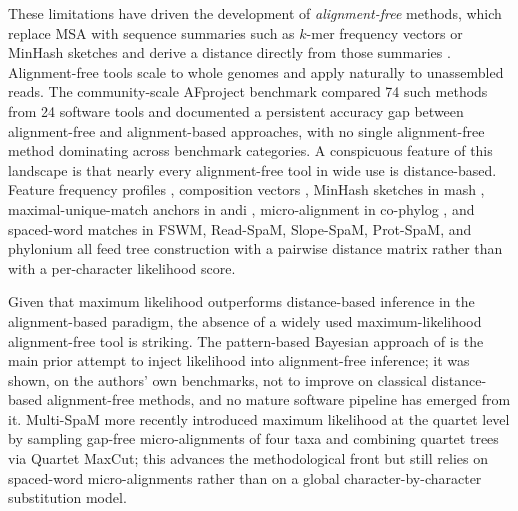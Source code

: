 \documentclass[11pt]{article}
\begin{document}
These limitations have driven the development of \emph{alignment-free} methods,
which replace MSA with sequence summaries such as $k$-mer frequency vectors
or MinHash sketches and derive a distance directly from those summaries
\citep{vinga2003review, zielezinski2017review}. Alignment-free tools scale to
whole genomes and apply naturally to unassembled reads. The community-scale
AFproject benchmark \citep{zielezinski2019afproject} compared 74 such methods
from 24 software tools and documented a persistent accuracy gap between
alignment-free and alignment-based approaches, with no single alignment-free
method dominating across benchmark categories. A conspicuous feature of this
landscape is that nearly every alignment-free tool in wide use is
distance-based. Feature frequency profiles
\citep{sims2009ffp}, composition vectors \citep{gao2007cvtree, lu2017cafe},
MinHash sketches in mash \citep{ondov2016mash}, maximal-unique-match anchors
in andi \citep{haubold2015andi}, micro-alignment in co-phylog
\citep{yi2013cophylog}, and spaced-word matches in FSWM, Read-SpaM,
Slope-SpaM, Prot-SpaM, and phylonium
\citep{morgenstern2015spacedwords, lau2019readspam, rohling2020slopespam,
leimeister2019protspam, klotzl2020phylonium} all feed tree construction with
a pairwise distance matrix rather than with a per-character likelihood score.

Given that maximum likelihood outperforms distance-based inference in the
alignment-based paradigm, the absence of a widely used maximum-likelihood
alignment-free tool is striking. The pattern-based Bayesian approach of
\citet{hohl2007alignmentfree} is the main prior attempt to inject likelihood
into alignment-free inference; it was shown, on the authors' own benchmarks,
not to improve on classical distance-based alignment-free methods, and no
mature software pipeline has emerged from it. Multi-SpaM
\citep{dencker2020multispam} more recently introduced maximum likelihood at
the quartet level by sampling gap-free micro-alignments of four taxa and
combining quartet trees via Quartet MaxCut; this advances the methodological
front but still relies on spaced-word micro-alignments rather than on a
global character-by-character substitution model.
\end{document}
